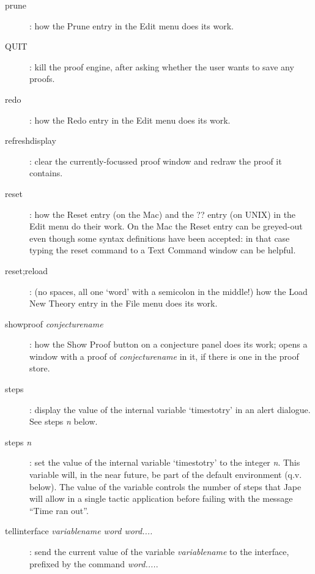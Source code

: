 \begin{description}
\item[prune]: how the Prune entry in the Edit menu does its work.

\item[QUIT]: kill the proof engine, after asking whether the user wants to save any proofs.

\item[redo]: how the Redo entry in the Edit menu does its work.

\item[refreshdisplay]: clear the currently-focussed proof window and redraw the proof it contains.


\item[reset]: how the Reset entry (on the Mac) and the ?? entry (on UNIX) in the Edit menu do their work. On the Mac the Reset entry can be greyed-out even though some syntax definitions have been accepted: in that case typing the reset command to a Text Command window can be helpful.


\item[reset;reload]: (no spaces, all one `word' with a semicolon in the middle!) how the Load New Theory entry in the File menu does its work.

\item[showproof \textit{conjecturename}]: how the Show Proof button on a conjecture panel does its work; opens a window with a proof of \textit{conjecturename} in it, if there is one in the proof store.


\item[steps]: display the value of the internal variable `timestotry' in an alert dialogue. See steps \textit{n} below.


\item[steps \textit{n}]: set the value of the internal variable `timestotry' to the integer \textit{n}. This variable will, in the near future, be part of the default environment (q.v. below). The value of the variable controls the number of steps that Jape will allow in a single tactic application before failing with the message ``Time ran out''.


\item[tellinterface \textit{variablename word word....}]: send the current value of the variable \textit{variablename} to the interface, prefixed by the command \textit{word....}.



\end{description}
